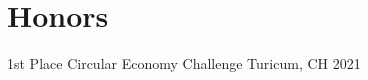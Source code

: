 \section{Honors}
\begin{cvhonors}

\cvhonor
{1st Place} %
{Circular Economy Challenge} %
{Turicum, CH} %
{2021} %

\end{cvhonors}